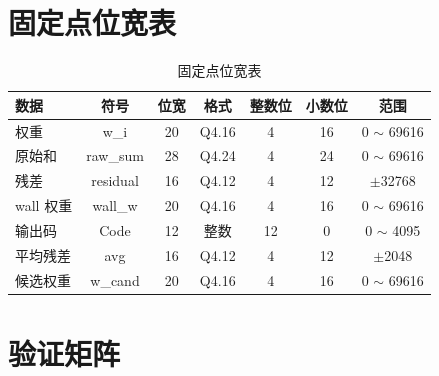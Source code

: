 \documentclass[UTF8,a4paper,11pt]{ctexart}
\begin{document}
\section{固定点位宽表}
\label{app:fixedpoint-bitwidth}

\begin{table}[H]
\centering
\caption{固定点位宽表}
\label{tab:app-fixedpoint}
\begin{tabular}{lcccccc}
\toprule
数据 & 符号 & 位宽 & 格式 & 整数位 & 小数位 & 范围 \\
\midrule
权重      & w\_i    & 20 & Q4.16 & 4 & 16 & 0 $\sim$ 69616 \\
原始和    & raw\_sum & 28 & Q4.24 & 4 & 24 & 0 $\sim$ 69616 \\
残差      & residual & 16 & Q4.12 & 4 & 12 & $\pm$32768 \\
wall 权重 & wall\_w  & 20 & Q4.16 & 4 & 16 & 0 $\sim$ 69616 \\
输出码    & Code     & 12 & 整数  & 12 & 0 & 0 $\sim$ 4095 \\
平均残差  & avg      & 16 & Q4.12 & 4 & 12 & $\pm$2048 \\
候选权重  & w\_cand  & 20 & Q4.16 & 4 & 16 & 0 $\sim$ 69616 \\
\bottomrule
\end{tabular}
\end{table}

\section{验证矩阵}
\label{app:verify-matrix}
\end{document}
